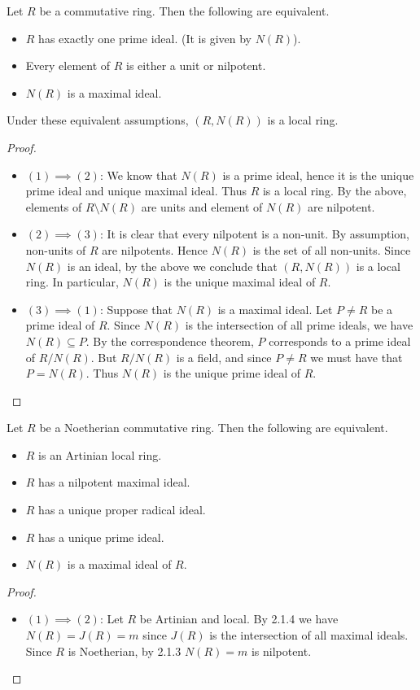 \documentclass[a4paper]{article}
\begin{document}
\begin{prp}{}{} Let $R$ be a commutative ring. Then the following are equivalent. 
\begin{itemize}
\item $R$ has exactly one prime ideal. (It is given by $N(R)$).
\item Every element of $R$ is either a unit or nilpotent. 
\item $N(R)$ is a maximal ideal. 
\end{itemize}
Under these equivalent assumptions, $(R,N(R))$ is a local ring. 
\begin{proof}~\\
\begin{itemize}
\item $(1)\implies(2)$: We know that $N(R)$ is a prime ideal, hence it is the unique prime ideal and unique maximal ideal. Thus $R$ is a local ring. By the above, elements of $R\setminus N(R)$ are units and element of $N(R)$ are nilpotent. 
\item $(2)\implies(3)$: It is clear that every nilpotent is a non-unit. By assumption, non-units of $R$ are nilpotents. Hence $N(R)$ is the set of all non-units. Since $N(R)$ is an ideal, by the above we conclude that $(R,N(R))$ is a local ring. In particular, $N(R)$ is the unique maximal ideal of $R$. 
\item $(3)\implies(1)$: Suppose that $N(R)$ is a maximal ideal. Let $P\neq R$ be a prime ideal of $R$. Since $N(R)$ is the intersection of all prime ideals, we have $N(R)\subseteq P$. By the correspondence theorem, $P$ corresponds to a prime ideal of $R/N(R)$. But $R/N(R)$ is a field, and since $P\neq R$ we must have that $P=N(R)$. Thus $N(R)$ is the unique prime ideal of $R$. 
\end{itemize}
\end{proof}
\end{prp}

\begin{prp}{}{} Let $R$ be a Noetherian commutative ring. Then the following are equivalent. 
\begin{itemize}
\item $R$ is an Artinian local ring. 
\item $R$ has a nilpotent maximal ideal. 
\item $R$ has a unique proper radical ideal. 
\item $R$ has a unique prime ideal. 
\item $N(R)$ is a maximal ideal of $R$. 
\end{itemize} 
\begin{proof}~\\
\begin{itemize}
\item $(1)\implies(2)$: Let $R$ be Artinian and local. By 2.1.4 we have $N(R)=J(R)=m$ since $J(R)$ is the intersection of all maximal ideals. Since $R$ is Noetherian, by 2.1.3 $N(R)=m$ is nilpotent. 
\end{itemize}
\end{proof}
\end{prp}
\end{document}
